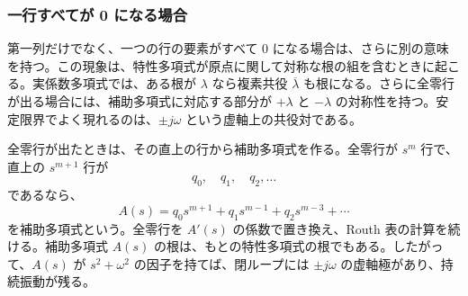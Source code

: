 \subsubsection{一行すべてが 0 になる場合}

第一列だけでなく、一つの行の要素がすべて 0 になる場合は、さらに別の意味を持つ。この現象は、特性多項式が原点に関して対称な根の組を含むときに起こる。実係数多項式では、ある根が $\lambda$ なら複素共役 $\overline{\lambda}$ も根になる。さらに全零行が出る場合には、補助多項式に対応する部分が $+\lambda$ と $-\lambda$ の対称性を持つ。安定限界でよく現れるのは、$\pm j\omega$ という虚軸上の共役対である。

全零行が出たときは、その直上の行から補助多項式を作る。全零行が $s^m$ 行で、直上の $s^{m+1}$ 行が
\begin{equation}
  q_0,\quad q_1,\quad q_2,\ldots
\end{equation}
であるなら、
\begin{equation}
  A(s)=q_0s^{m+1}+q_1s^{m-1}+q_2s^{m-3}+\cdots
\end{equation}
を補助多項式という。全零行を $A'(s)$ の係数で置き換え、Routh 表の計算を続ける。補助多項式 $A(s)$ の根は、もとの特性多項式の根でもある。したがって、$A(s)$ が $s^2+\omega^2$ の因子を持てば、閉ループには $\pm j\omega$ の虚軸極があり、持続振動が残る。

